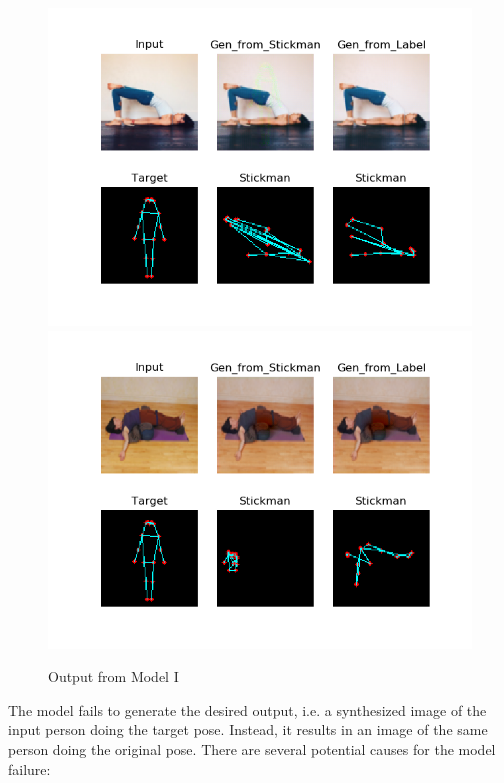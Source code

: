 \documentclass{article}
\begin{document}
\begin{figure}[H]
    \centering
    \includegraphics[scale=0.34]{f3.png}
    \includegraphics[scale=0.35]{f4.png}
    \caption{Output from Model I}
\end{figure}

\noindent
The model fails to generate the desired output, i.e. a synthesized image of the input person doing the target pose. Instead, it results in an image of the same person doing the original pose. There are several potential causes for the model failure:
\end{document}
